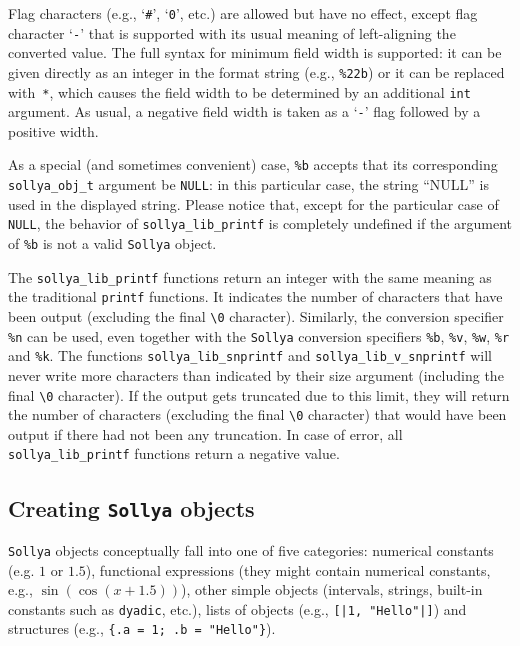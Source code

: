 \documentclass[a4paper]{article}
\newcommand{\sollya}{\texttt{Sollya}\xspace}
\begin{document}
Flag characters (e.g., `\verb|#|', `\verb|0|', etc.) are allowed but have no effect, except flag character `\verb|-|' that is supported with its usual meaning of left-aligning the converted value. The full syntax for minimum field width is supported: it can be given directly as an integer in the format string (e.g., \verb|%22b|) or it can be replaced with~\verb|*|, which causes the field width to be determined by an additional \verb|int| argument. As usual, a negative field width is taken as a `\verb|-|' flag followed by a positive width.

As a special (and sometimes convenient) case, \verb|%b| accepts that its corresponding \verb|sollya_obj_t| argument be \verb|NULL|: in this particular case, the string ``NULL'' is used in the displayed string. Please notice that, except for the particular case of \verb|NULL|, the behavior of \verb|sollya_lib_printf| is completely undefined if the argument of \verb|%b| is not a valid \sollya object.

The \verb|sollya_lib_printf| functions return an integer with the same meaning as the traditional \verb|printf| functions. It indicates the number of characters that have been output (excluding the final \verb|\0| character). Similarly, the conversion specifier \verb|%n| can be used, even together with the \sollya conversion specifiers \verb|%b|, \verb|%v|, \verb|%w|, \verb|%r| and  \verb|%k|. The functions \verb|sollya_lib_snprintf| and \verb|sollya_lib_v_snprintf| will
never write more characters than indicated by their size argument (including the final \verb|\0| character). If the output gets truncated due to this limit, they will return the number of characters (excluding the final \verb|\0| character) that would have been output if there had not been any truncation. In case of error, all \verb|sollya_lib_printf| functions return a negative value.

\subsection{Creating \sollya objects}
\sollya objects conceptually fall into one of five categories: numerical constants (e.g. $1$ or $1.5$), functional expressions (they might contain numerical constants, e.g., $\sin(\cos(x+1.5))$), other simple objects (intervals, strings, built-in constants such as \texttt{dyadic}, etc.), lists of objects (e.g., \texttt{[|1, "Hello"|]}) and structures (e.g., \verb|{.a = 1; .b = "Hello"}|).
\end{document}
